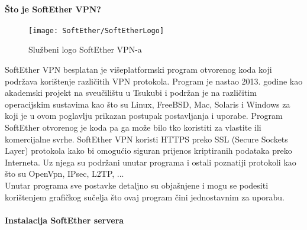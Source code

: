 \bigbreak
\paragraph*{Što je SoftEther VPN?}
\hfill \smallbreak
\begin{wrapfigure}{r}{0.5\textwidth} 
     \centering
     \texttt{[image: SoftEther/SoftEtherLogo]}
	\caption{Službeni logo SoftEther VPN-a}
\end{wrapfigure}

SoftEther VPN\cite{softether} besplatan je višeplatformski program otvorenog koda koji podržava korištenje različitih VPN protokola. Program je nastao 2013. godine kao akademski projekt na sveučilištu u Tsukubi i podržan je na različitim operacijskim sustavima kao što su Linux, FreeBSD, Mac, Solaris i Windows za koji je u ovom poglavlju prikazan postupak postavljanja i uporabe.
\smallbreak
Program SoftEther otvorenog je koda pa ga može bilo tko koristiti za vlastite ili komercijalne svrhe.\smallbreak
SoftEther VPN koristi HTTPS preko SSL (Secure Sockets Layer)\cite{ssl}
protokola kako bi omogućio siguran prijenos kriptiranih podataka preko Interneta. Uz njega su podržani unutar programa i ostali poznatiji protokoli kao što su OpenVpn, IPsec, L2TP, ...\\
Unutar programa sve postavke detaljno su objašnjene i mogu se podesiti korištenjem grafičkog sučelja što ovaj program čini jednostavnim za uporabu.

\FloatBarrier

\bigbreak
\paragraph*{Instalacija SoftEther servera}

